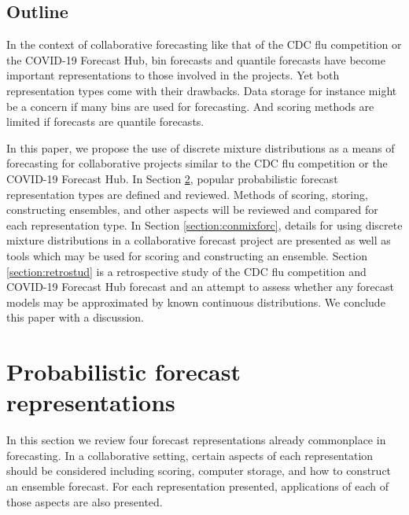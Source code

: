 \documentclass[11pt,notitlepage]{isuthesis}
\begin{document}
\section{Outline}
In the context of collaborative forecasting like that of the CDC flu competition
or the COVID-19 Forecast Hub, bin forecasts and quantile forecasts have become
important representations to those involved in the projects. Yet both 
representation types come 
with their drawbacks. Data 
storage for instance might be a concern if many bins are used for forecasting. 
And scoring methods are limited if forecasts are quantile forecasts.

In this paper, we propose the use of discrete mixture distributions as a means 
of forecasting for collaborative projects similar to the CDC flu competition or 
the COVID-19
Forecast Hub. In Section \ref{section:representations}, 
popular probabilistic forecast representation 
types are defined and reviewed. Methods of scoring, storing, constructing 
ensembles, and other aspects will be reviewed and compared for each 
representation type.
In Section \ref{section:conmixforc}, details for using discrete mixture 
distributions in a collaborative forecast project are presented as well as tools
which may be used for scoring and constructing an ensemble.
Section \ref{section:retrostud} is a retrospective study of the CDC flu 
competition and COVID-19 Forecast Hub
forecast and an attempt to assess whether any forecast models
may be approximated by known continuous distributions. We conclude this 
paper with a discussion.






















\chapter{Probabilistic forecast representations}
\label{section:representations}

In this section we review four forecast representations already commonplace in 
forecasting. In a collaborative setting, certain aspects of each representation
should be considered including scoring, computer storage, and how to construct
an ensemble forecast. For each representation presented, applications of each of 
those aspects are also presented.
\end{document}
